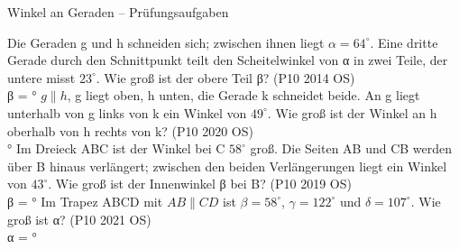 \setcounter{aufgabe}{7}

\begin{aufgabe}{Winkel an Geraden – Prüfungsaufgaben}
\begin{teile}
\teil Die Geraden g und h schneiden sich; zwischen ihnen liegt $\alpha = 64^\circ$. Eine dritte Gerade durch den Schnittpunkt teilt den Scheitelwinkel von α in zwei Teile, der untere misst $23^\circ$. Wie groß ist der obere Teil β? \hfill (P10 2014 OS) \\ β = \leerfeld °
\teil $g \parallel h$, g liegt oben, h unten, die Gerade k schneidet beide. An g liegt unterhalb von g links von k ein Winkel von $49^\circ$. Wie groß ist der Winkel an h oberhalb von h rechts von k? \hfill (P10 2020 OS) \\

\leerfeld °
\teil Im Dreieck ABC ist der Winkel bei C $58^\circ$ groß. Die Seiten AB und CB werden über B hinaus verlängert; zwischen den beiden Verlängerungen liegt ein Winkel von $43^\circ$. Wie groß ist der Innenwinkel β bei B? \hfill (P10 2019 OS) \\ β = \leerfeld °
\teil Im Trapez ABCD mit $AB \parallel CD$ ist $\beta = 58^\circ$, $\gamma = 122^\circ$ und $\delta = 107^\circ$. Wie groß ist α? \hfill (P10 2021 OS) \\

α = \leerfeld °
\end{teile}
\end{aufgabe}

